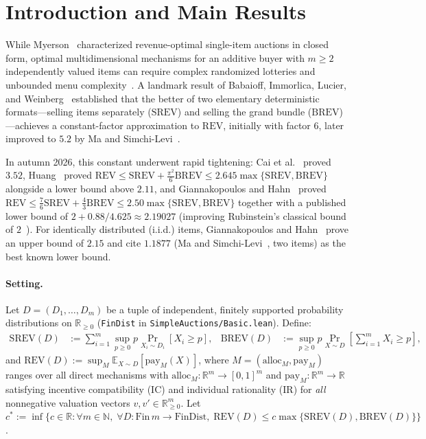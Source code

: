 \documentclass[11pt]{article}
\newcommand{\REV}{\mathrm{REV}}
\newcommand{\SREV}{\mathrm{SREV}}
\newcommand{\BREV}{\mathrm{BREV}}
\newcommand{\E}{\mathbb{E}}
\newcommand{\R}{\mathbb{R}}
\begin{document}
\section{Introduction and Main Results}

While Myerson~\cite{myerson1981} characterized revenue-optimal single-item auctions in closed form, optimal multidimensional mechanisms for an additive buyer with $m \ge 2$ independently valued items can require complex randomized lotteries and unbounded menu complexity~\cite{hartnisan2017,daskalakis2017}. A landmark result of Babaioff, Immorlica, Lucier, and Weinberg~\cite{bilw2020} established that the better of two elementary deterministic formats---selling items separately ($\SREV$) and selling the grand bundle ($\BREV$)---achieves a constant-factor approximation to $\REV$, initially with factor $6$, later improved to $5.2$ by Ma and Simchi-Levi~\cite{masimchilevi2021}.

In autumn 2026, this constant underwent rapid tightening: Cai et al.~\cite{cai2026} proved $3.52$, Huang~\cite{huang2026} proved $\REV \le \SREV + \frac{\pi^2}{6}\BREV \le 2.645 \max\{\SREV,\BREV\}$ alongside a lower bound above $2.11$, and Giannakopoulos and Hahn~\cite{gh2026} proved $\REV \le \frac{7}{6}\SREV + \frac{4}{3}\BREV \le 2.50 \max\{\SREV,\BREV\}$ together with a published lower bound of $2 + 0.88/4.625 \approx 2.19027$ (improving Rubinstein's classical bound of $2$~\cite{rubinstein2016}). For identically distributed (i.i.d.) items, Giannakopoulos and Hahn~\cite{gh2026} prove an upper bound of $2.15$ and cite $1.1877$ (Ma and Simchi-Levi~\cite{masimchilevi2021}, two items) as the best known lower bound.

\paragraph{Setting.}
Let $D = (D_1, \dots, D_m)$ be a tuple of independent, finitely supported probability distributions on $\R_{\ge 0}$ (\texttt{FinDist} in \texttt{SimpleAuctions/Basic.lean}). Define:
\begin{align*}
  \SREV(D) &:= \sum_{i=1}^m \sup_{p \ge 0} p \Pr_{X_i \sim D_i}[X_i \ge p], &
  \BREV(D) &:= \sup_{p \ge 0} p \Pr_{X \sim D}\!\left[\sum_{i=1}^m X_i \ge p\right],
\end{align*}
and $\REV(D) := \sup_{M} \E_{X \sim D}[\mathrm{pay}_M(X)]$, where $M = (\mathrm{alloc}_M, \mathrm{pay}_M)$ ranges over all direct mechanisms with $\mathrm{alloc}_M : \R^m \to [0,1]^m$ and $\mathrm{pay}_M : \R^m \to \R$ satisfying incentive compatibility (IC) and individual rationality (IR) for \emph{all} nonnegative valuation vectors $v, v' \in \R_{\ge 0}^m$. Let $c^* := \inf\{c \in \R : \forall m \in \mathbb{N},\; \forall D : \mathrm{Fin}\,m \to \mathrm{FinDist},\; \REV(D) \le c \max\{\SREV(D),\BREV(D)\}\}$.
\end{document}
